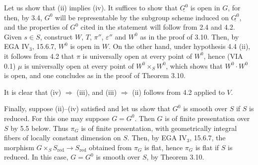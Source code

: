 Let us show that (ii) implies (iv). It suffices to show that $\underline{G^0}$ is open in $G$, for then, by 3.4, $G^0$ will be representable by the subgroup scheme induced on $\underline{G^0}$, and the properties of $G^0$ cited in the statement will follow from 2.4 and 4.2. Given $s\in S$, construct $W$, $T$, $\pi''$, $\varepsilon''$ and $W^0$ as in the proof of 3.10. Then, by EGA IV$_3$, 15.6.7, $W^0$ is open in $W$. On the other hand, under hypothesis 4.4 (ii), it follows from 4.2 that $\pi$ is universally open at every point of $W^0$, hence (VIA 0.1) $\mu$ is universally open at every point of $W^0\times_SW^0$, which shows that $W^0\cdot W^0$ is open, and one concludes as in the proof of Theorem 3.10.

It is clear that (iv) $\Rightarrow$ (iii), and (iii) $\Rightarrow$ (ii) follows from 4.2 applied to $V$.

Finally, suppose (ii)--(iv) satisfied and let us show that $G^0$ is smooth over $S$ if $S$ is reduced. For this one may suppose $G=G^0$. Then $G$ is of finite presentation over $S$ by 5.5 below. Thus $\pi_G$ is of finite presentation, with geometrically integral fibers of locally constant dimension on $S$. Then, by EGA IV$_3$, 15.6.7, the morphism $G\times_SS_{\mathrm{red}}\to S_{\mathrm{red}}$ obtained from $\pi_G$ is flat, hence $\pi_G$ is flat if $S$ is reduced. In this case, $G=G^0$ is smooth over $S$, by Theorem 3.10.

